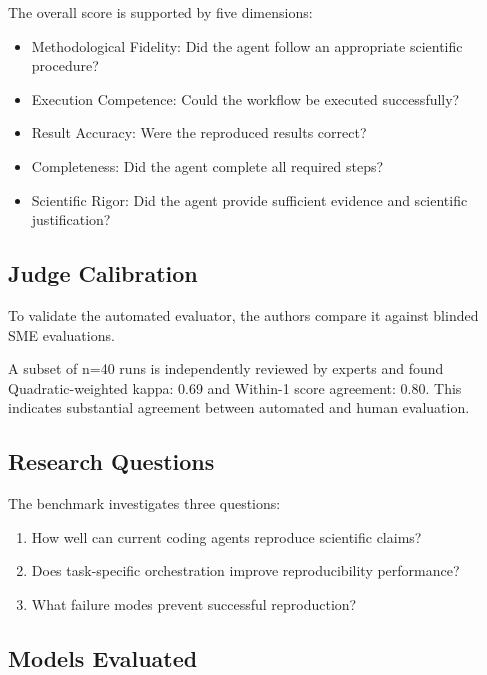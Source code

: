 \documentclass[11pt]{article}
\begin{document}
The overall score is supported by five dimensions:
\begin{itemize}
    \item Methodological Fidelity: Did the agent follow an appropriate scientific procedure?

    \item Execution Competence: Could the workflow be executed successfully?

    \item Result Accuracy: Were the reproduced results correct?

    \item Completeness: Did the agent complete all required steps?

    \item Scientific Rigor: Did the agent provide sufficient evidence and scientific justification?

\end{itemize}

\subsection*{Judge Calibration}

To validate the automated evaluator, the authors compare it against blinded SME evaluations.

A subset of n=40 runs is independently reviewed by experts and found Quadratic-weighted kappa: 0.69 and Within-1 score agreement: 0.80. This indicates substantial agreement between automated and human evaluation.

\subsection*{Research Questions}

The benchmark investigates three questions:
\begin{enumerate}
    \item How well can current coding agents reproduce scientific claims?
    \item Does task-specific orchestration improve reproducibility performance?
    \item What failure modes prevent successful reproduction?
\end{enumerate}

\subsection*{Models Evaluated}
\end{document}
